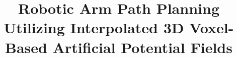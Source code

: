 \documentclass[]{article}
\title{Robotic Arm Path Planning Utilizing Interpolated 3D Voxel-Based Artificial Potential Fields}
\author{}
\begin{document}
\maketitle

\begin{abstract}

\end{abstract}

\section{}
\end{document}
